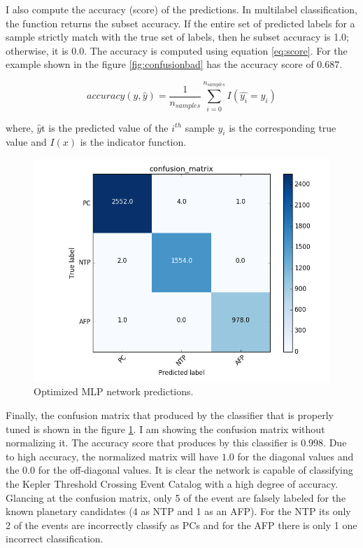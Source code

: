I also compute the accuracy (score) of the predictions.  In multilabel classification, the function returns the subset accuracy. If the entire set of predicted labels for a sample strictly match with the true set of labels, then he subset accuracy is 1.0; otherwise, it is 0.0. The accuracy is computed using equation \ref{eq:score}. For the example shown in the figure \ref{fig:confusionbad} has the accuracy score of $0.687$.

\begin{equation}
accuracy(y, \hat{y}) = \frac{1}{n_{samples}}\sum_{i=0}^{n_{samples}}I(\hat{y_i} = y_i)
\label{eq:score}
\end{equation}

where, $\hat{y}$t is the predicted value of the $i^{th}$ sample $y_i$ is the corresponding true value and $I(x)$ is the indicator function.

\begin{figure}[!h]
\begin{center}
        \includegraphics[width=0.5\textheight]{img/confusion_matrix_good.png}
        \caption{Optimized MLP network predictions.}  \label{fig:confusiongood}
\end{center}
\end{figure}


Finally, the confusion matrix that produced by the classifier that is properly tuned is shown in the figure \ref{fig:confusiongood}. I am showing the confusion matrix without normalizing it. The accuracy score that produces by this classifier is $0.998$. Due to high accuracy, the normalized matrix will have $1.0$ for the diagonal values and the $0.0$ for the off-diagonal values. It is clear the network is capable of classifying the Kepler Threshold Crossing Event Catalog with a high degree of accuracy. Glancing at the confusion matrix,  only 5 of the event are falsely labeled for the known planetary candidates (4 as NTP and 1 as an AFP). For the NTP its only 2 of the events are incorrectly classify as PCs and for the AFP there is only 1 one incorrect classification. 

